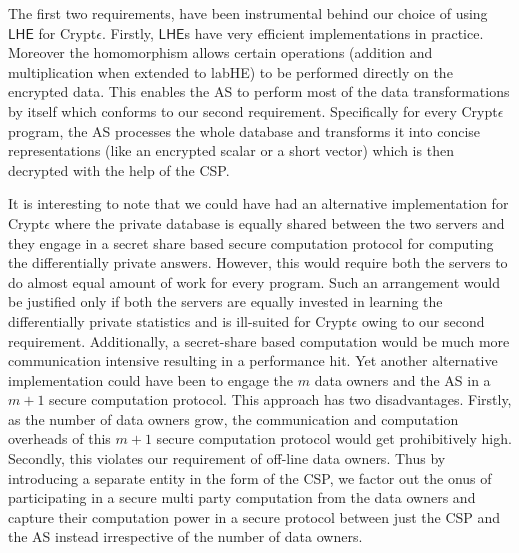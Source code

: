 The first two requirements, have been instrumental behind our choice of using $\textsf{LHE}$ for Crypt$\epsilon$. Firstly, $\textsf{LHE}$s have very efficient implementations in practice. Moreover the homomorphism allows certain operations (addition and multiplication when extended to \textsf{labHE}) to be performed directly on the encrypted data. This enables the \textsf{AS} to perform most of the data transformations by itself which conforms to our second requirement. Specifically for every Crypt$\epsilon$ program, the \textsf{AS} processes the whole database and transforms it into concise representations (like an encrypted scalar or a short vector) which is then decrypted with the help of the \textsf{CSP}. \par It is interesting to note that we could have had an alternative implementation for Crypt$\epsilon$ where the private database is equally shared between the two servers and they engage in a secret share based secure computation protocol for computing the differentially private answers. However, this would require both the servers to do almost equal amount of work for every program. Such an arrangement would be justified only if both the servers are equally invested in learning the differentially private statistics and is ill-suited for Crypt$\epsilon$ owing to our second requirement. Additionally, a secret-share based computation would be much more communication intensive resulting in a performance hit. Yet another alternative implementation could have been to engage the $m$ data owners and the \textsf{AS} in a $m+1$ secure computation protocol. This approach has two disadvantages. Firstly, as the number of data owners grow, the communication and computation overheads of this $m+1$ secure computation protocol would get prohibitively high. Secondly, this violates our requirement of off-line data owners. Thus by introducing a separate entity in the form of the \textsf{CSP}, we factor out the onus of participating in a secure multi party computation from the data owners and capture their computation power in a secure protocol between just the \textsf{CSP} and the \textsf{AS} instead %
irrespective of the number of data owners. %

